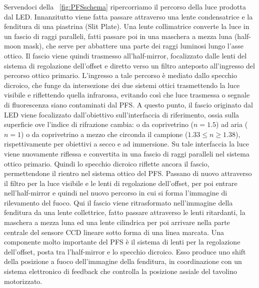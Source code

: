 Servendoci della \figurename~\ref{fig:PFSschema} ripercorriamo il percorso della luce prodotta dal LED. 
Innanzitutto viene fatta passare attraverso una lente condensatrice e la fenditura di una piastrina (Slit Plate).
Una lente collimatrice converte la luce in un fascio di raggi paralleli, fatti passare poi in una maschera a mezza luna (half-moon mask), che serve per abbattere una parte dei raggi luminosi lungo l'asse ottico.
Il fascio viene quindi trasmesso all'half-mirror, focalizzato dalle lenti del sistema di regolazione dell'offset e diretto verso un filtro anteposto all'ingresso del percorso ottico primario. 
L'ingresso a tale percorso è mediato dallo specchio dicroico, che funge da intersezione dei due sistemi ottici trasmettendo la luce visibile e riflettendo quella infrarossa, evitando così che luce trasmessa o segnale di fluorescenza siano contaminati dal PFS. 
A questo punto, il fascio originato dal LED viene focalizzato dall'obiettivo sull'interfaccia di riferimento, ossia sulla superficie ove l'indice di rifrazione cambia: o da coprivetrino ($n=1.5$) ad aria ($n=1$) o da coprivetrino a mezzo che circonda il campione ($1.33\leq n \geq 1.38$), rispettivamente per obiettivi a secco e ad immersione. 
Su tale interfaccia la luce viene nuovamente riflessa e convertita in una fascio di raggi paralleli nel sistema ottico primario. 
Quindi lo specchio dicroico riflette ancora il fascio, permettendone il rientro nel sistema ottico del PFS.
Passano di nuovo attraverso il filtro per la luce visibile e le lenti di regolazione dell'offset, per poi entrare nell'half-mirror e quindi nel nuovo percorso in cui si forma l'immagine di rilevamento del fuoco. 
Qui il fascio viene ritrasformato nell'immagine della fenditura da una lente collettrice, fatto passare attraverso le lenti ritardanti, la maschera a mezza luna ed una lente cilindrica per poi arrivare nella parte centrale del sensore CCD lineare sotto forma di una linea marcata.
Una componente molto importante del PFS è il sistema di lenti per la regolazione dell'offset, posta tra l'half-mirror e lo specchio dicroico.
Esso produce uno shift della posizione a fuoco dell'immagine della fenditura, in coordinazione con un sistema elettronico di feedback che controlla la posizione assiale del tavolino motorizzato.

